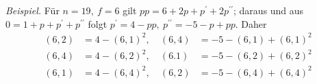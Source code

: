 \textit{Beispiel.} Für \(n=19,\allowbreak \ f=6\) gilt \(pp=6+2p+p^{\prime}+2p^{\prime\prime}\); daraus und aus \(0=1+p+p^{\prime}+p^{\prime\prime}\) folgt \(p^{\prime}=4-pp,\allowbreak \ p^{\prime\prime}=-5-p+pp\). Daher \[\begin{aligned}(6,2)&=4-(6,1)^2,\ &(6,4)&=-5-(6,1)+(6,1)^2\\(6,\allowbreak 4)&=4-(6,\allowbreak 2)^2,\allowbreak \ &(6.1)&=-5-(6,\allowbreak 2)+(6,\allowbreak 2)^2\\(6,\allowbreak 1)&=4-(6,\allowbreak 4)^2,\allowbreak \ &(6,\allowbreak 2)&=-5-(6,\allowbreak 4)+(6,\allowbreak 4)^2\end{aligned}\]


